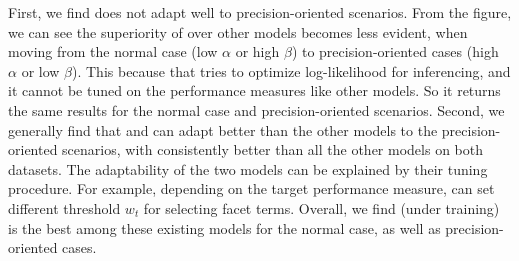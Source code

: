 First, we find \QFJ does not adapt well to precision-oriented scenarios. From the figure, we can see the superiority of \QFJ over other models becomes less evident, when moving from the normal case (low $\alpha$ or high $\beta$) to precision-oriented cases (high $\alpha$ or low $\beta$). This because that \QFJ tries to optimize log-likelihood for inferencing, and it cannot be tuned on the performance measures like other models. So it returns the same results for the normal case and precision-oriented scenarios. Second, we generally find that \QFI and \QDM can adapt better than the other models to the precision-oriented scenarios, with \QFI consistently better than all the other models on both datasets. The adaptability of the two models can be explained by their tuning procedure. For example, depending on the target performance measure, \QFI can set different threshold $w_t$ for selecting facet terms. Overall, we find \QFI (under \MLE training) is the best among these existing models for the normal case, as 
well as precision-oriented cases.
 
